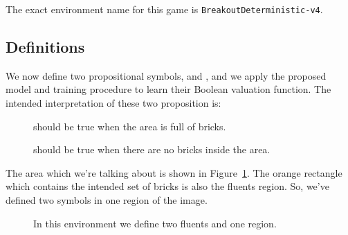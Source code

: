 The exact environment name for this game is \verb|BreakoutDeterministic-v4|.


\subsection{Definitions}

We now define two propositional symbols,  and , and
we apply the proposed model and training procedure to learn their Boolean
valuation function. The intended interpretation of these two proposition
is:
\begin{description}
	\item [] should be true when the area is full of bricks.
	\item [] should be true when there are no bricks inside the
		area.
\end{description}
The area which we're talking about is shown in
Figure~\ref{fig:breakout-fluents}. The orange rectangle which contains the
intended set of bricks is also the fluents region. So, we've defined two
symbols in one region of the image.
\begin{figure}
	\centering
	\caption{In this environment we define two fluents and one region.}
	\label{fig:breakout-fluents}
\end{figure}

